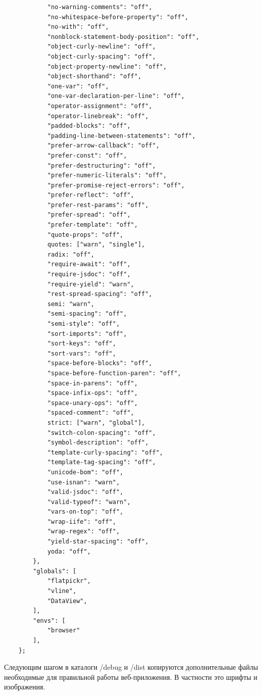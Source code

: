 \begin{small}
\begin{verbatim}
            "no-warning-comments": "off",
            "no-whitespace-before-property": "off",
            "no-with": "off",
            "nonblock-statement-body-position": "off",
            "object-curly-newline": "off",
            "object-curly-spacing": "off",
            "object-property-newline": "off",
            "object-shorthand": "off",
            "one-var": "off",
            "one-var-declaration-per-line": "off",
            "operator-assignment": "off",
            "operator-linebreak": "off",
            "padded-blocks": "off",
            "padding-line-between-statements": "off",
            "prefer-arrow-callback": "off",
            "prefer-const": "off",
            "prefer-destructuring": "off",
            "prefer-numeric-literals": "off",
            "prefer-promise-reject-errors": "off",
            "prefer-reflect": "off",
            "prefer-rest-params": "off",
            "prefer-spread": "off",
            "prefer-template": "off",
            "quote-props": "off",
            quotes: ["warn", "single"],
            radix: "off",
            "require-await": "off",
            "require-jsdoc": "off",
            "require-yield": "warn",
            "rest-spread-spacing": "off",
            semi: "warn",
            "semi-spacing": "off",
            "semi-style": "off",
            "sort-imports": "off",
            "sort-keys": "off",
            "sort-vars": "off",
            "space-before-blocks": "off",
            "space-before-function-paren": "off",
            "space-in-parens": "off",
            "space-infix-ops": "off",
            "space-unary-ops": "off",
            "spaced-comment": "off",
            strict: ["warn", "global"],
            "switch-colon-spacing": "off",
            "symbol-description": "off",
            "template-curly-spacing": "off",
            "template-tag-spacing": "off",
            "unicode-bom": "off",
            "use-isnan": "warn",
            "valid-jsdoc": "off",
            "valid-typeof": "warn",
            "vars-on-top": "off",
            "wrap-iife": "off",
            "wrap-regex": "off",
            "yield-star-spacing": "off",
            yoda: "off",
        },
        "globals": [
            "flatpickr",
            "vline",
            "DataView",
        ],
        "envs": [
            "browser"
        ],
    };
\end{verbatim}
\end{small}


Следующим шагом в каталоги /debug и /dist копируются дополнительные файлы необходимые для правильной работы веб-приложения. В частности это шрифты и изображения.

